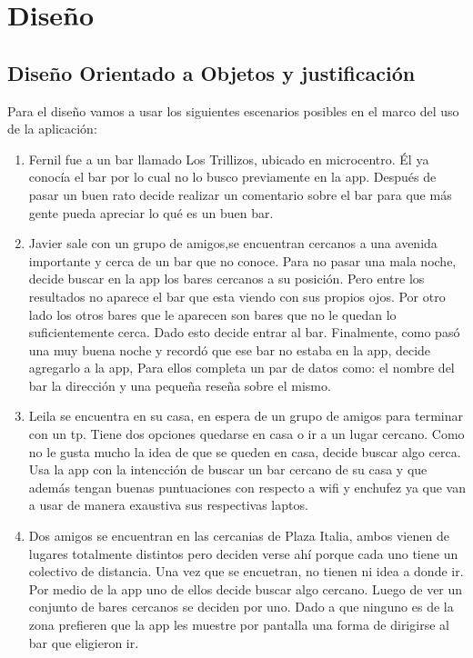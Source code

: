 \section{Diseño}
\subsection{Diseño Orientado a Objetos y justificación}

Para el diseño vamos a usar los siguientes escenarios posibles en el marco del uso de la aplicación:

\begin{enumerate}
\item Fernil fue a un bar llamado Los Trillizos, ubicado en microcentro. Él ya conocía el bar por lo cual no lo busco previamente en la app. Después de pasar un buen rato decide realizar un comentario sobre el bar para que más gente pueda apreciar lo qué es un buen bar.

\item Javier sale con un grupo de amigos,se encuentran cercanos a una avenida importante y cerca de un bar que no conoce. Para no pasar una mala noche, decide buscar en la app los bares cercanos a su posición. Pero entre los resultados no aparece el bar que esta viendo con sus propios ojos. Por otro lado los otros bares que le aparecen son bares que no le quedan lo suficientemente cerca. Dado esto decide entrar al bar. Finalmente, como pasó una muy buena noche y recordó que ese bar no estaba en la app, decide agregarlo a la app, Para ellos completa un par de datos como: el nombre del bar la dirección y una pequeña reseña sobre el mismo. 

\item Leila se encuentra en su casa, en espera de un grupo de amigos para terminar con un tp. Tiene dos opciones quedarse en casa o ir a un lugar cercano. Como no le gusta mucho la idea de que se queden en casa, decide buscar algo cerca. Usa la app con la intencción de buscar un bar cercano de su casa y que además tengan buenas puntuaciones con respecto a wifi y enchufez ya que van a usar de manera exaustiva sus respectivas laptos.

\item Dos amigos se encuentran en las cercanias de Plaza Italia, ambos vienen de lugares totalmente distintos pero deciden verse ahí porque cada uno tiene un colectivo de distancia. Una vez que se encuetran, no tienen ni idea a donde ir. Por medio de la app uno de ellos decide buscar algo cercano. Luego de ver un conjunto de bares cercanos se deciden por uno. Dado a que ninguno es de la zona prefieren que la app les muestre por pantalla una forma de dirigirse al bar que eligieron ir.


\end{enumerate}
